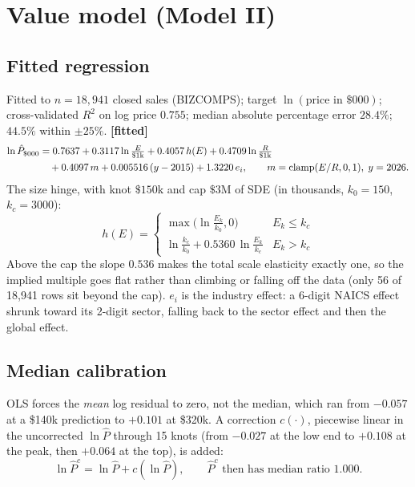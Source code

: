 \documentclass[11pt]{article}
\DeclareMathOperator{\clamp}{clamp}
\newcommand{\fit}{\textbf{[fitted]}}
\begin{document}
\section{Value model (Model II)}
\subsection{Fitted regression}
Fitted to $n=18{,}941$ closed sales (BIZCOMPS); target $\ln(\text{price in \$000})$; cross-validated $R^2$ on log price $0.755$; median absolute percentage error $28.4\%$; $44.5\%$ within $\pm25\%$. \fit
\begin{align}
\ln\hat P_{\$000}&=0.7637+0.3117\ln\tfrac{E}{\$1\text{k}}+0.4057\,h(E)+0.4709\ln\tfrac{R}{\$1\text{k}}\notag\\
&\quad+0.4097\,m+0.005516\,(y-2015)+1.3220\,e_i,\qquad m=\clamp(E/R,0,1),\;y=2026.
\end{align}
The size hinge, with knot $\$150$k and cap $\$3$M of SDE (in thousands, $k_0=150$, $k_c=3000$):
\begin{equation}
h(E)=\begin{cases}\max\!\big(\ln\tfrac{E_k}{k_0},0\big) & E_k\le k_c\\[2pt]
\ln\tfrac{k_c}{k_0}+0.5360\,\ln\tfrac{E_k}{k_c} & E_k>k_c\end{cases}
\end{equation}
Above the cap the slope $0.536$ makes the total scale elasticity exactly one, so the implied multiple goes flat rather than climbing or falling off the data (only 56 of 18,941 rows sit beyond the cap). $e_i$ is the industry effect: a 6-digit NAICS effect shrunk toward its 2-digit sector, falling back to the sector effect and then the global effect.

\subsection{Median calibration}
OLS forces the \emph{mean} log residual to zero, not the median, which ran from $-0.057$ at a \$140k prediction to $+0.101$ at \$320k. A correction $c(\cdot)$, piecewise linear in the uncorrected $\ln\hat P$ through 15 knots (from $-0.027$ at the low end to $+0.108$ at the peak, then $+0.064$ at the top), is added:
\begin{equation}
\ln\hat P^{c}=\ln\hat P+c(\ln\hat P),\qquad \hat P^{c}\text{ then has median ratio }1.000.
\end{equation}
\end{document}

